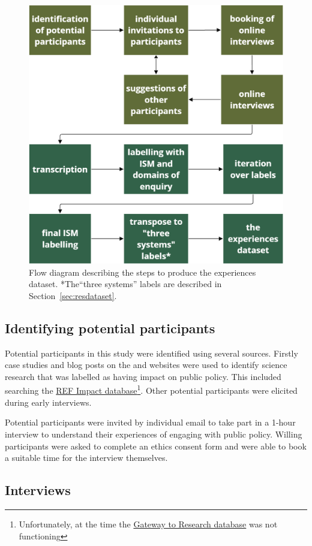 \begin{figure}[!ht]
    \centering
    \includegraphics[width=.75\linewidth]{figures/method_flow.png}
    \caption{Flow diagram describing the steps to produce the experiences dataset. *The``three systems'' labels are described in Section~\ref{sec:resdataset}.}
    \label{fig:metflowchart}
\end{figure}

\subsection{Identifying potential participants}\label{sec:metidentify}

Potential participants in this study were identified using several sources. Firstly case studies and blog posts on the \REF{} and \UKRI{} websites were used to identify \CAN{} science research that was labelled as having impact on public policy. This included searching the \href{https://results2021.ref.ac.uk/impact}{REF Impact database}\footnote{Unfortunately, at the time the \UKRI{} \href{https://gtr.gtr.ukri.org/}{Gateway to Research database} was not functioning}. Other potential participants were elicited during early interviews.

Potential participants were invited by individual email to take part in a 1-hour interview to understand their experiences of engaging with public policy. Willing participants were asked to complete an ethics consent form and were able to book a suitable time for the interview themselves.

\subsection{Interviews}\label{sec:metinterview}

